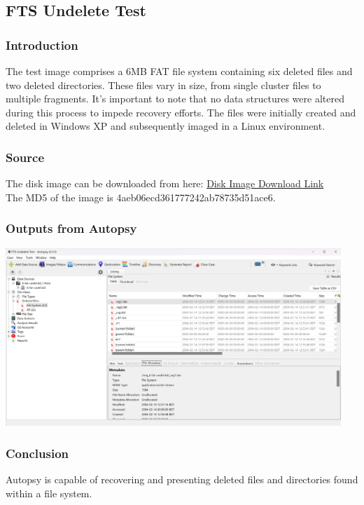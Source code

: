 \documentclass{article}
\begin{document}
\subsection{FTS Undelete Test}
\subsubsection*{Introduction}
The test image comprises a 6MB FAT file system containing six deleted files and two deleted directories. These files vary in size, from single cluster files to multiple fragments. It's important to note that no data structures were altered during this process to impede recovery efforts. The files were initially created and deleted in Windows XP and subsequently imaged in a Linux environment.

\subsubsection*{Source}
The disk image can be downloaded from here: \href{http://prdownloads.sourceforge.net/dftt/6-undel-fat.zip?download}{Disk Image Download Link} \\
The MD5 of the image is 4aeb06ecd361777242ab78735d51ace6.

\subsubsection*{Outputs from Autopsy}
\begin{center}
    \includegraphics[width=0.95\textwidth]{6/6.3/FTS Deleted Files.png}
\end{center}

\subsubsection*{Conclusion}
Autopsy is capable of recovering and presenting deleted files and directories found within a file system.
\end{document}
